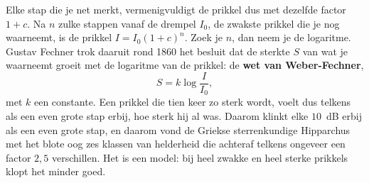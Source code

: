 Elke stap die je net merkt, vermenigvuldigt de prikkel dus met dezelfde factor $1 + c$. Na $n$ zulke stappen vanaf de drempel $I_0$, de zwakste prikkel die je nog waarneemt, is de prikkel $I = I_0 (1 + c)^n$. Zoek je $n$, dan neem je de logaritme. Gustav Fechner trok daaruit rond 1860 het besluit dat de sterkte $S$ van wat je waarneemt groeit met de logaritme van de prikkel: de \textbf{wet van Weber-Fechner},
\[S = k \log \frac{I}{I_0} ,\]
met $k$ een constante. Een prikkel die tien keer zo sterk wordt, voelt dus telkens als een even grote stap erbij, hoe sterk hij al was. Daarom klinkt elke $10$~dB erbij als een even grote stap, en daarom vond de Griekse sterrenkundige Hipparchus met het blote oog zes klassen van helderheid die achteraf telkens ongeveer een factor $2{,}5$ verschillen. Het is een model: bij heel zwakke en heel sterke prikkels klopt het minder goed.


\begin{oefeningen}
\end{oefeningen}

\opdrachtenkop

